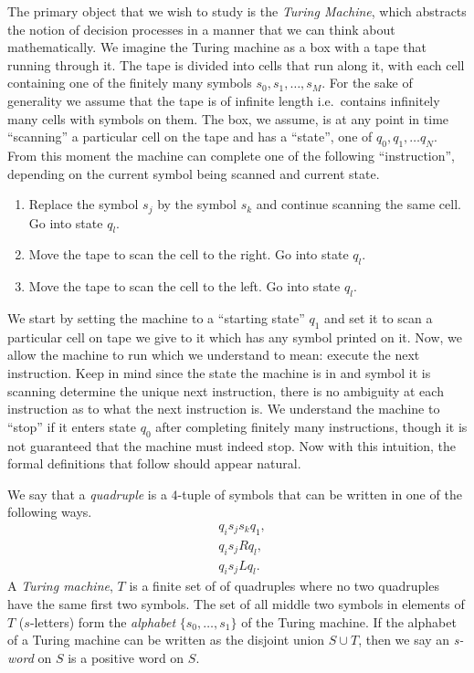 The primary object that we wish to study is the \emph{Turing Machine}, which abstracts the notion of decision processes in a manner that we can think about mathematically. We imagine the Turing machine as a box with a tape that running through it. The tape is divided into cells that run along it, with each cell containing one of the finitely many symbols $s_0,s_1,\dots,s_M$. For the sake of generality we assume that the tape is of infinite length i.e.\ contains infinitely many cells with symbols on them. The box, we assume, is at any point in time ``scanning'' a particular cell on the tape and has a ``state'', one of $q_0,q_1,\dots q_N$. From this moment the machine can complete one of the following ``instruction'', depending on the current symbol being scanned and current state.
\begin{enumerate}
\item Replace the symbol $s_j$ by the symbol $s_k$ and continue scanning the same cell. Go into state $q_l$.
\item Move the tape to scan the cell to the right. Go into state $q_l$.
\item Move the tape to scan the cell to the left. Go into state $q_l$.
\end{enumerate}
We start by setting the machine to a ``starting state'' $q_1$ and set it to  scan a particular cell on tape we give to it which has any symbol printed on it. Now, we allow the machine to run which we understand to mean: execute the next instruction. Keep in mind since the state the machine is in and symbol it is scanning determine the unique next instruction, there is no ambiguity at each instruction as to what the next instruction is. We understand the machine to ``stop'' if it enters state $q_0$ after completing finitely many instructions, though it is not guaranteed that the machine must indeed stop. Now with this intuition, the formal definitions that follow should appear natural.

\begin{definition}
  We say that a \emph{quadruple} is a $4$-tuple of symbols that can be written in one of the following ways.
  \begin{align*}
    & q_is_js_kq_1, \\
    & q_is_jRq_l, \\
    & q_is_jLq_l.
  \end{align*}
  A \emph{Turing machine}, $T$ is a finite set of of quadruples where no two quadruples have the same first two symbols. The set of all middle two symbols in elements of $T$ ($s$-letters) form the \emph{alphabet} $\{s_0, \dots, s_1\}$ of the Turing machine. If the alphabet of a Turing machine can be written as the disjoint union $S \cup T$, then we say an \emph{s-word} on $S$ is a positive word on $S$.
\end{definition}

